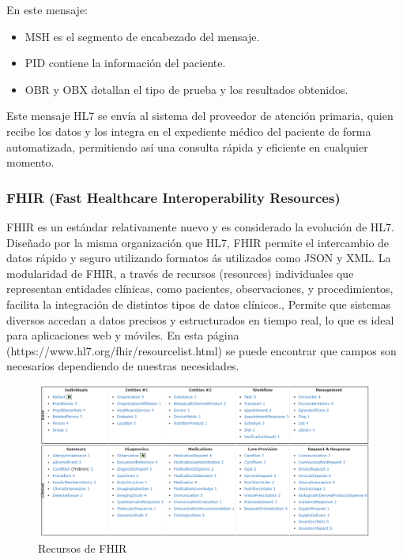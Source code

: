 \documentclass[12pt, a4paper, twoside]{article}
\begin{document}
	
	
	En este mensaje:
	\begin{itemize}
		\item MSH es el segmento de encabezado del mensaje.
		\item PID contiene la información del paciente.
		\item OBR y OBX detallan el tipo de prueba y los resultados obtenidos.
	\end{itemize}
	
	Este mensaje HL7 se envía al sistema del proveedor de atención primaria, quien recibe los datos y los integra en el expediente médico del paciente de forma automatizada, permitiendo así una consulta rápida y eficiente en cualquier momento.
	
	
	\subsubsection{FHIR (Fast Healthcare Interoperability Resources)} 
	
	FHIR es un estándar relativamente nuevo y es considerado la evolución de HL7. Diseñado por la misma organización que HL7, FHIR permite el intercambio de datos rápido y seguro utilizando formatos ás utilizados como JSON y XML. La modularidad de FHIR, a través de recursos (resources) individuales que representan entidades clínicas, como pacientes, observaciones, y procedimientos, facilita la integración de distintos tipos de datos clínicos., Permite que sistemas diversos accedan a datos precisos y estructurados en tiempo real, lo que es ideal para aplicaciones web y móviles.
	En esta página (https://www.hl7.org/fhir/resourcelist.html) se puede encontrar que campos son necesarios dependiendo de nuestras necesidades. 
	
	\begin{figure}[h!]
		\includegraphics[width=1\textwidth]{image/1.png}
		\caption{Recursos de FHIR}
		\label{fig:1}
	\end{figure}
	\vspace{5cm}
	
\end{document}
